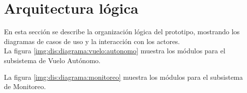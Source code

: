 %



\section{Arquitectura lógica}

En esta sección se describe la organización lógica del prototipo, mostrando los 
diagramas de casos de uso y la interacción con los actores. \\
La figura \ref{img:dis:diagrama:vuelo:autonomo} muestra los módulos para el 
subsistema de Vuelo Autónomo.


La figura \ref{img:dis:diagrama:monitoreo} muestra los módulos para el 
subsistema de Monitoreo.

